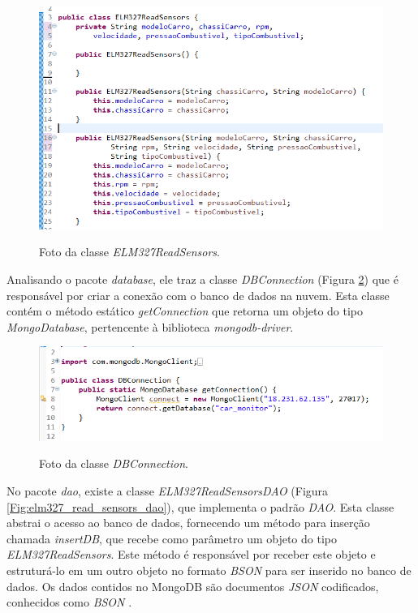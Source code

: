 \begin{figure}[!ht]
\centering
\caption{Foto da classe \textit{ELM327ReadSensors}.} 
{\includegraphics[scale=.66]{imagens/pacoteModel-ELM327ReadSensors.png}}\\
 \label{Fig:elm327_read_sensors}
\end{figure}

Analisando o pacote \textit{database}, ele traz a classe \textit{DBConnection} (Figura \ref{Fig:db_connection}) que é responsável por criar a conexão com o banco de dados na nuvem. Esta classe contém o método estático \textit{getConnection} que retorna um objeto do tipo \textit{MongoDatabase}, pertencente à biblioteca \textit{mongodb-driver}.

\begin{figure}[!ht]
\centering
\caption{Foto da classe \textit{DBConnection}.} 
{\includegraphics[scale=.66]{imagens/pacoteDatabase-DBConnection.png}}\\
 \label{Fig:db_connection}
\end{figure}

No pacote \textit{dao}, existe a classe \textit{ELM327ReadSensorsDAO} (Figura \ref{Fig:elm327_read_sensors_dao}), que implementa o padrão \textit{DAO}. Esta classe abstrai o acesso ao banco de dados, fornecendo um método para inserção chamada \textit{insertDB}, que recebe como parâmetro um objeto do tipo \textit{ELM327ReadSensors}. Este método é responsável por receber este objeto e estruturá-lo em um outro objeto no formato \textit{BSON} para ser inserido no banco de dados. Os dados contidos no MongoDB são documentos \textit{JSON} codificados, conhecidos como \textit{BSON} \cite{mongodbjsonbson}.

